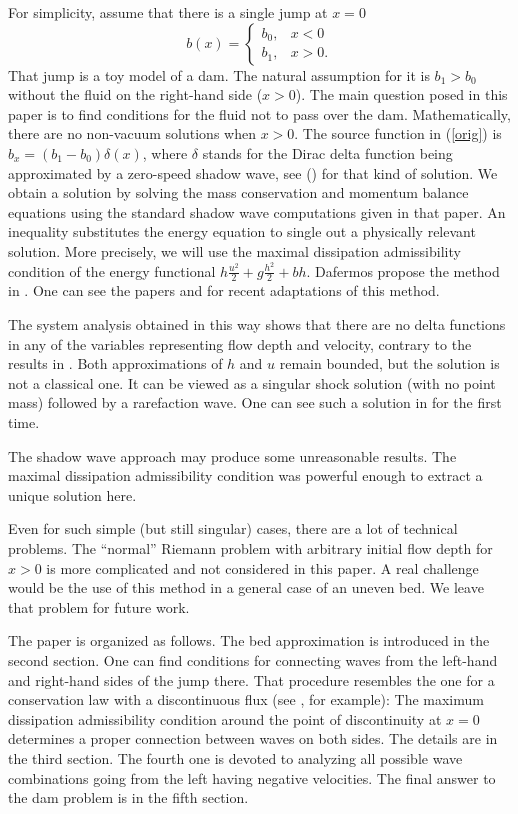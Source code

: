 \documentclass{article}
\theoremstyle{plain}
\theoremstyle{definition}
\theoremstyle{remark}
\begin{document}
For simplicity, assume that there is a single jump at $x=0$
\[
b(x)=\begin{cases}
b_{0}, & x<0 \\
b_{1}, & x>0.
\end{cases}
\]
That jump is a toy model of a dam. The natural assumption for it 
is $b_{1}>b_{0}$ without
the fluid on the right-hand side ($x>0$). 
The main question posed in this paper is to find  
conditions for the fluid not to pass over the dam. 
Mathematically, there are no non-vacuum solutions when $x>0$. 
The source function in (\ref{orig}) is 
$b_{x}=(b_{1}-b_{0})\delta(x)$, where $\delta$ stands for 
the Dirac delta function being
approximated by a zero-speed shadow wave, see (\cite{MN2010})
for that kind of solution. 
We obtain a solution by solving the mass conservation and momentum balance 
equations using the standard shadow wave computations given in that paper. 
An inequality substitutes the energy equation 
to single out a physically relevant solution.
More precisely, we will use the maximal dissipation 
admissibility condition of the energy functional 
$ h\frac{u^{2}}{2} + g\frac{h^{2}}{2} + bh$.
Dafermos propose the method in \cite{D1973}. 
One can see the papers \cite{F2014} and \cite{NR2022}  
for recent adaptations of this method.

The system analysis obtained in this way shows that there are no 
delta functions in any of the variables representing flow depth and velocity,
contrary to the results in \cite{KMT2017}. Both approximations
of $h$ and $u$ remain bounded, but the solution is not a classical
one. It can be viewed as a singular shock solution (with no point mass)
followed by a rarefaction wave. One can see such a solution
in \cite{KK1995} for the first time. 

The shadow wave approach may produce some unreasonable results. 
The maximal dissipation admissibility condition was
powerful enough to extract a unique solution here. 

Even for such simple (but still singular) cases, there are
a lot of technical problems.
The ``normal'' Riemann problem with arbitrary initial flow depth for $x>0$ 
is more complicated and not considered in this paper. 
A real challenge would be the use of 
this method in a general case of an uneven bed. We leave that problem for future work. 

The paper is organized as follows. The bed approximation is introduced
in the second section. One can find conditions for connecting waves
from the left-hand and right-hand sides of the jump there. 
That procedure resembles the one for a conservation law with 
a discontinuous flux (see  \cite{BK2008}, for example): 
The maximum dissipation admissibility condition
around the point of discontinuity at $x=0$ 
determines a proper connection between waves on both sides. 
The details are in the third section. The fourth one is devoted to 
analyzing all possible wave combinations going from the left having  
negative velocities. The final answer to the dam problem is in 
the fifth section.
\end{document}
